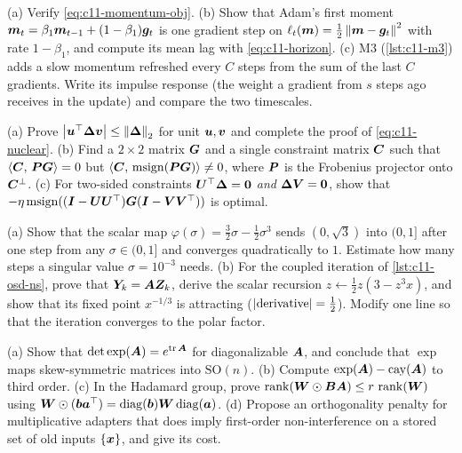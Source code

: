 \begin{exercise}\label{exr:c11-momentum}
(a) Verify \cref{eq:c11-momentum-obj}. (b) Show that Adam's first moment
$\bm{m}_t = \beta_1\bm{m}_{t-1} + (1-\beta_1)\bm{g}_t$ is one gradient step on
$\ell_t(\bm{m}) = \tfrac12\left\lVert \bm{m} - \bm{g}_t\right\rVert^2$ with rate $1-\beta_1$, and compute its mean lag with
\cref{eq:c11-horizon}. (c) M3 (\cref{lst:c11-m3}) adds a slow momentum refreshed every $C$ steps
from the sum of the last $C$ gradients. Write its impulse response (the weight a gradient from
$s$ steps ago receives in the update) and compare the two timescales.
\end{exercise}

\begin{exercise}\label{exr:c11-spectral}
(a) Prove $\left\lvert \bm{u}^{\top}\bm{\Delta}\bm{v}\right\rvert \le \left\lVert \bm{\Delta}\right\rVert_2$ for unit $\bm{u},\bm{v}$ and complete the proof
of \cref{eq:c11-nuclear}. (b) Find a $2\times2$ matrix $\bm{G}$ and a single constraint matrix $\bm{C}$
such that $\left\langle \bm{C},\, \bm{P}\bm{G}\right\rangle = 0$ but $\left\langle \bm{C},\, \operatorname{msign}(\bm{P}\bm{G})\right\rangle \neq 0$, where
$\bm{P}$ is the Frobenius projector onto $\bm{C}^\perp$. (c) For two-sided constraints
$\bm{U}^{\top}\bm{\Delta} = \bm{0}$ \emph{and} $\bm{\Delta}\bm{V} = \bm{0}$, show that
$-\eta\operatorname{msign}((\bm{I}-\bm{U}\bm{U}^{\top})\bm{G}(\bm{I}-\bm{V}\bm{V}^{\top}))$ is optimal.
\end{exercise}

\begin{exercise}\label{exr:c11-ns}
(a) Show that the scalar map $\varphi(\sigma) = \tfrac32\sigma - \tfrac12\sigma^3$ sends
$(0,\sqrt3)$ into $(0, 1]$ after one step from any $\sigma \in (0,1]$ and converges quadratically
to $1$. Estimate how many steps a singular value $\sigma = 10^{-3}$ needs. (b) For the coupled
iteration of \cref{lst:c11-osd-ns}, prove that $\bm{Y}_k = \bm{A}\bm{Z}_k$, derive the scalar recursion
$z \leftarrow \tfrac12z(3 - z^3x)$, and show that its fixed point $x^{-1/3}$ is attracting
($\left\lvert \text{derivative}\right\rvert = \tfrac12$). Modify one line so that the iteration converges to the polar
factor.
\end{exercise}

\begin{exercise}\label{exr:c11-lie}
(a) Show that $\det\exp(\bm{A}) = e^{\operatorname{tr}\bm{A}}$ for diagonalizable $\bm{A}$, and conclude that $\exp$ maps
skew-symmetric matrices into $\mathrm{SO}(n)$. (b) Compute $\exp(\bm{A}) - \operatorname{cay}(\bm{A})$ to
third order. (c) In the Hadamard group, prove $\operatorname{rank}(\bm{W}\odot\bm{B}\bm{A}) \le r\,\operatorname{rank}(\bm{W})$ using
$\bm{W}\odot(\bm{b}\bm{a}^{\top}) = \operatorname{diag}(\bm{b})\bm{W}\operatorname{diag}(\bm{a})$. (d) Propose an orthogonality penalty for
multiplicative adapters that does imply first-order non-interference on a stored set of old
inputs $\{\bm{x}\}$, and give its cost.
\end{exercise}

